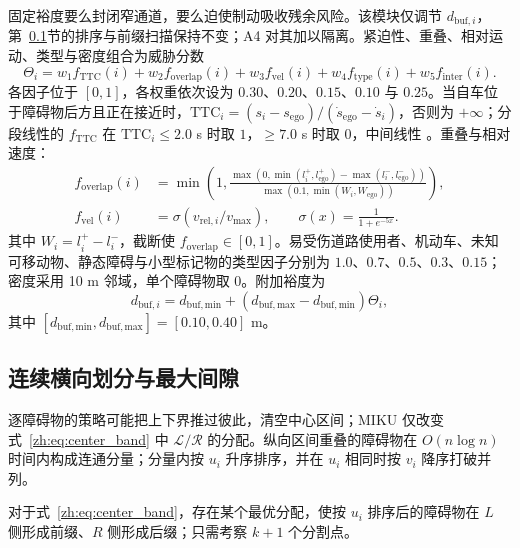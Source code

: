 固定裕度要么封闭窄通道，要么迫使制动吸收残余风险。该模块仅调节 $d_{\mathrm{buf},i}$，第~\ref{zh:sec:method_band}节的排序与前缀扫描保持不变；A4 对其加以隔离。紧迫性、重叠、相对运动、类型与密度组合为威胁分数
\begin{equation}
 \Theta_i=w_1f_{\mathrm{TTC}}(i)+w_2f_{\mathrm{overlap}}(i)+w_3f_{\mathrm{vel}}(i)+w_4f_{\mathrm{type}}(i)+w_5f_{\mathrm{inter}}(i).
 \label{zh:eq:threat_score}
\end{equation}
各因子位于 $[0,1]$，各权重依次设为 $0.30$、$0.20$、$0.15$、$0.10$ 与 $0.25$。当自车位于障碍物后方且正在接近时，$\mathrm{TTC}_i=(s_i-s_{\mathrm{ego}})/(\dot{s}_{\mathrm{ego}}-\dot{s}_i)$，否则为 $+\infty$；分段线性的 $f_{\mathrm{TTC}}$ 在 $\mathrm{TTC}_i\leq2.0$ s 时取 $1$，$\geq7.0$ s 时取 $0$，中间线性 \citep{minderhoud2001extended}。重叠与相对速度：
\begin{align}
 f_{\mathrm{overlap}}(i)&=\min\!\left(1,\frac{\max(0,\min(l_i^+,l_{\mathrm{ego}}^+)-\max(l_i^-,l_{\mathrm{ego}}^-))}{\max(0.1,\min(W_i,W_{\mathrm{ego}}))}\right),\\
 f_{\mathrm{vel}}(i)&=\sigma(v_{\mathrm{rel},i}/v_{\max}),\qquad \sigma(x)=\frac{1}{1+e^{-5x}}.
\end{align}
其中 $W_i=l_i^+-l_i^-$，截断使 $f_{\mathrm{overlap}}\!\in\![0,1]$。易受伤道路使用者、机动车、未知可移动物、静态障碍与小型标记物的类型因子分别为 $1.0$、$0.7$、$0.5$、$0.3$、$0.15$；密度采用 10 m 邻域，单个障碍物取 $0$。附加裕度为
\begin{equation}
 d_{\mathrm{buf},i}=d_{\mathrm{buf,min}}+(d_{\mathrm{buf,max}}-d_{\mathrm{buf,min}})\Theta_i,
 \label{zh:eq:dynamic_delta}
\end{equation}
其中 $[d_{\mathrm{buf,min}},d_{\mathrm{buf,max}}]=[0.10,0.40]$ m。

\subsection{连续横向划分与最大间隙}
\label{zh:sec:method_band}

逐障碍物的策略可能把上下界推过彼此，清空中心区间；MIKU 仅改变式~\eqref{zh:eq:center_band} 中 $\mathcal{L}/\mathcal{R}$ 的分配。纵向区间重叠的障碍物在 $O(n\log n)$ 时间内构成连通分量；分量内按 $u_i$ 升序排序，并在 $u_i$ 相同时按 $v_i$ 降序打破并列。

\begin{lemma}[连续最优划分]
\label{zh:lem:continuous_partition}
对于式~\eqref{zh:eq:center_band}，存在某个最优分配，使按 $u_i$ 排序后的障碍物在 $L$ 侧形成前缀、$R$ 侧形成后缀；只需考察 $k+1$ 个分割点。
\end{lemma}

